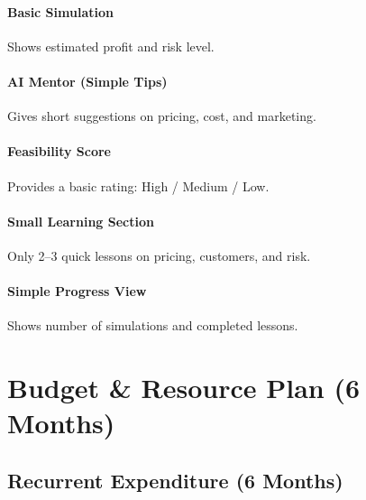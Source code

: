 \documentclass[12pt,letterpaper]{article}
\begin{document}
\paragraph{Basic Simulation}
Shows estimated profit and risk level.

\paragraph{AI Mentor (Simple Tips)}
Gives short suggestions on pricing, cost, and marketing.

\paragraph{Feasibility Score}
Provides a basic rating: High / Medium / Low.

\paragraph{Small Learning Section}
Only 2–3 quick lessons on pricing, customers, and risk.

\paragraph{Simple Progress View}
Shows number of simulations and completed lessons.

\section{Budget \& Resource Plan (6 Months)}

\subsection{Recurrent Expenditure (6 Months)}
\end{document}
